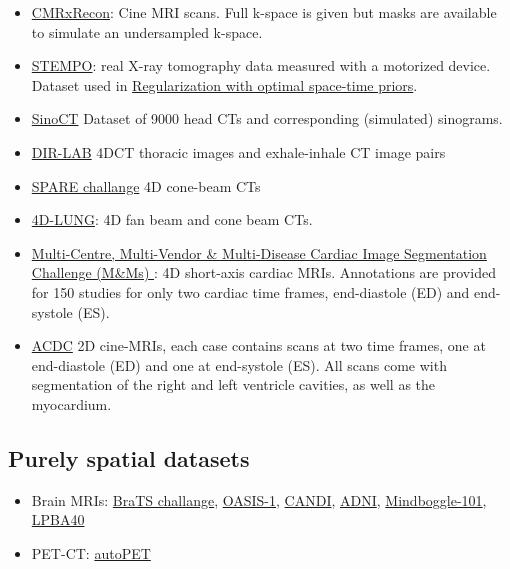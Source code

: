 \documentclass{article}
\begin{document}
\begin{itemize}
    \item \href{https://www.nature.com/articles/s41597-024-03525-4}{CMRxRecon}: Cine MRI scans. Full k-space is given but masks are available to simulate an undersampled k-space.

    \item \href{https://fips.fi/open-datasets/x-ray-tomographic-datasets/stempo-dynamic-x-ray-tomography-phantom-dataset/}{STEMPO}: real X-ray tomography data measured with a motorized device. Dataset used in \href{https://arxiv.org/pdf/2405.06337}{Regularization with optimal space-time priors}.

    \item \href{https://aimi.stanford.edu/datasets/sinoct}{SinoCT} Dataset of 9000 head CTs and corresponding (simulated) sinograms.

    \item \href{https://med.emory.edu/departments/radiation-oncology/research-laboratories/deformable-image-registration/index.html}{DIR-LAB} 4DCT thoracic images and exhale-inhale CT image pairs

    \item \href{https://image-x.sydney.edu.au/spare-challenge/}{SPARE challange} 4D cone-beam CTs

    \item \href{https://www.cancerimagingarchive.net/collection/4d-lung/}{4D-LUNG}: 4D fan beam and cone beam CTs.

    \item \href{https://www.ub.edu/mnms/}{Multi-Centre, Multi-Vendor \& Multi-Disease Cardiac Image Segmentation Challenge (M\&Ms) }: 4D short-axis cardiac MRIs. Annotations are provided for 150 studies for only two cardiac time frames, end-diastole (ED) and end-systole (ES).

    \item \href{https://www.creatis.insa-lyon.fr/Challenge/acdc/databases.html}{ACDC} 2D cine-MRIs, each case contains scans at two time frames, one at end-diastole (ED) and one at end-systole (ES). All scans come with segmentation of the right and left ventricle cavities, as well as the myocardium.
\end{itemize}

\subsection{Purely spatial datasets}

\begin{itemize}
    \item Brain MRIs: \href{http://braintumorsegmentation.org/}{BraTS challange}, \href{https://sites.wustl.edu/oasisbrains/home/oasis-1/}{OASIS-1}, \href{https://www.nitrc.org/projects/candi_share/}{CANDI}, \href{https://adni.loni.usc.edu/data-samples/adni-data/neuroimaging/mri/}{ADNI}, \href{https://mindboggle.info/data}{Mindboggle-101}, \href{https://www.loni.usc.edu/research/atlases}{LPBA40}

    \item PET-CT: \href{https://autopet-iii.grand-challenge.org/task/}{autoPET}
\end{itemize}
\end{document}
